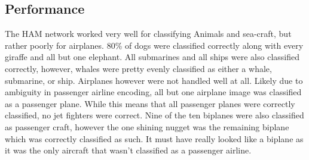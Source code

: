 \documentclass{article}
\begin{document}
\subsection{Performance}
The HAM network worked very well for classifying Animals and sea-craft, but rather poorly for airplanes.  80\% of dogs were classified correctly along with every giraffe and all but one elephant.  All submarines and all ships were also classified correctly, however, whales were pretty evenly classified as either a whale, submarine, or ship.  Airplanes however were not handled well at all.  Likely due to ambiguity in passenger airline encoding, all but one airplane image was classified as a passenger plane.  While this means that all passenger planes were correctly classified, no jet fighters were correct.  Nine of the ten biplanes were also classified as passenger craft, however the one shining nugget was the remaining biplane which was correctly classified as such.  It must have really looked like a biplane as it was the only aircraft that wasn't classified as a passenger airline.
\end{document}
